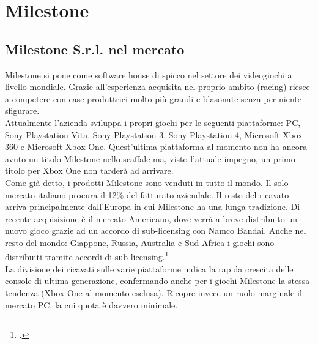
\chapter{Milestone}
\label{cap:milestone}

\section{Milestone S.r.l. nel mercato}

Milestone si pone come software house di spicco nel settore dei videogiochi a livello mondiale. Grazie all'esperienza acquisita nel proprio ambito (racing) riesce a competere con case produttrici molto più grandi e blasonate senza per niente sfigurare.\\

Attualmente l'azienda sviluppa i propri giochi per le seguenti piattaforme: PC, Sony Playstation Vita\textsuperscript{\textregistered}, Sony Playstation 3\textsuperscript{\textregistered}, Sony Playstation 4\textsuperscript{\textregistered}, Microsoft Xbox 360\textsuperscript{\textregistered} e Microsoft Xbox One\textsuperscript{\textregistered}. Quest'ultima piattaforma al momento non ha ancora avuto un titolo Milestone nello scaffale ma, visto l'attuale impegno, un primo titolo per Xbox One\textsuperscript{\textregistered} non tarderà ad arrivare.\\

Come già detto, i prodotti Milestone sono venduti in tutto il mondo. Il solo mercato italiano procura il 12\% del fatturato aziendale. Il resto del ricavato arriva principalmente dall'Europa in cui Milestone ha una lunga tradizione. Di recente acquisizione è il mercato Americano, dove verrà a breve distribuito un nuovo gioco grazie ad un accordo di sub-licensing con Namco Bandai. Anche nel resto del mondo: Giappone, Russia, Australia e Sud Africa i giochi sono distribuiti tramite accordi di sub-licensing.\footcite{site:accordo-namco-bandai}\\

La divisione dei ricavati sulle varie piattaforme indica la rapida crescita delle console di ultima generazione, confermando anche per i giochi Milestone la stessa tendenza (Xbox One\textsuperscript{\textregistered} al momento esclusa). Ricopre invece un ruolo marginale il mercato PC, la cui quota è davvero minimale.\\

